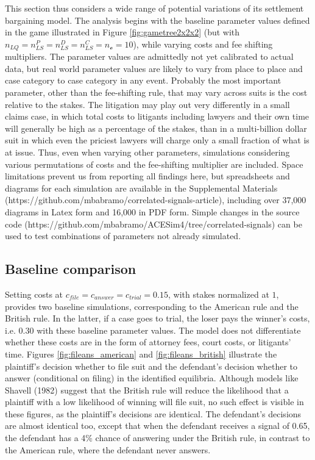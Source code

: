 \documentclass{article}
\begin{document}
This section thus considers a wide range of potential variations of its settlement bargaining model. The analysis begins with the baseline parameter values defined in the game illustrated in Figure \ref{fig:gametree2x2x2} (but with $n_{LQ}=n_{LS}^P=n_{LS}^D=n_{LS}^C=n_{\mathcal{o}}=10$), while varying costs and fee shifting multipliers. The parameter values are admittedly not yet calibrated to actual data, but real world parameter values are likely to vary from place to place and case category to case category in any event. Probably the most important parameter, other than the fee-shifting rule, that may vary across suits is the cost relative to the stakes. The litigation may play out very differently in a small claims case, in which total costs to litigants including lawyers and their own time will generally be high as a percentage of the stakes, than in a multi-billion dollar suit in which even the priciest lawyers will charge only a small fraction of what is at issue. Thus, even when varying other parameters, simulations considering various permutations of costs and the fee-shifting multiplier are included. Space limitations prevent us from reporting all findings here, but spreadsheets and diagrams for each simulation are available in the Supplemental Materials (https://github.com/mbabramo/correlated-signals-article), including over 37,000 diagrams in Latex form and 16,000 in PDF form. Simple changes in the source code (https://github.com/mbabramo/ACESim4/tree/correlated-signals) can be used to test combinations of parameters not already simulated.

\subsection{Baseline comparison} \label{baseline}

Setting costs at $c_{file} = c_{answer} = c_{trial} = 0.15$, with stakes normalized at $1$, provides two baseline simulations, corresponding to the American rule and the British rule. In the latter, if a case goes to trial, the loser pays the winner's costs, i.e. $0.30$ with these baseline parameter values. The model does not differentiate whether these costs are in the form of attorney fees, court costs, or litigants' time. Figures \ref{fig:fileans_american} and \ref{fig:fileans_british} illustrate the plaintiff's decision whether to file suit and the defendant's decision whether to answer (conditional on filing) in the identified equilibria. Although models like Shavell (1982) \cite{shavell} suggest that the British rule will reduce the likelihood that a plaintiff with a low likelihood of winning will file suit, no such effect is visible in these figures, as the plaintiff's decisions are identical. The defendant's decisions are almost identical too, except that when the defendant receives a signal of 0.65, the defendant has a 4\% chance of answering under the British rule, in contrast to the American rule, where the defendant never answers. 
\end{document}
